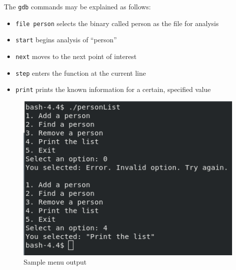 \documentclass[
	letterpaper, %
	10pt, %
]{CSUniSchoolLabReport}
\begin{document}
The \texttt{gdb} commands may be explained as follows:

\begin{itemize}

  \item \texttt{file person} selects the binary called person as the file for analysis

  \item \texttt{start} begins analysis of ``person''

  \item \texttt{next} moves to the next point of interest

  \item \texttt{step} enters the function at the current line

  \item \texttt{print} prints the known information for a certain, specified value

\end{itemize}



\begin{figure}[H]
  \centering
  \includegraphics[width=.9\textwidth]{Figures/output.png}
  \caption{Sample menu output}
  \label{fig:2}
\end{figure}
\end{document}
